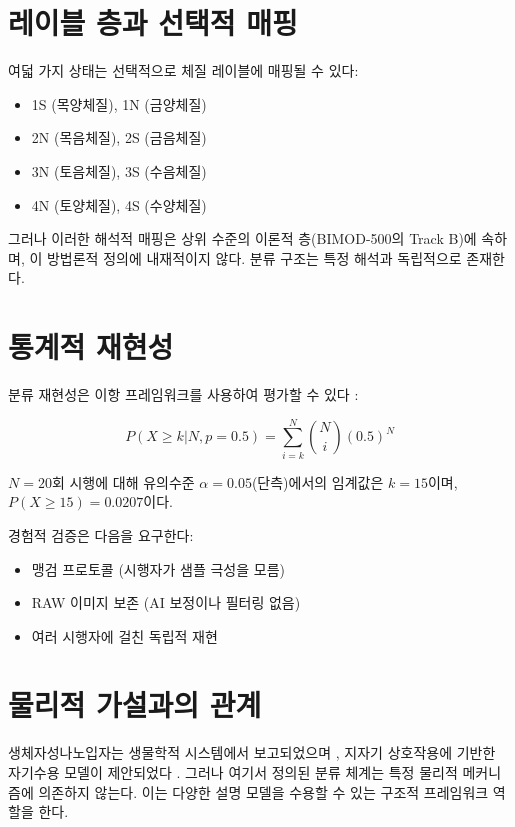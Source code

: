 \documentclass[12pt,a4paper]{article}
\begin{document}
\section{레이블 층과 선택적 매핑}

여덟 가지 상태는 선택적으로 체질 레이블에 매핑될 수 있다:

\begin{itemize}
    \item 1S (목양체질), 1N (금양체질)
    \item 2N (목음체질), 2S (금음체질)
    \item 3N (토음체질), 3S (수음체질)
    \item 4N (토양체질), 4S (수양체질)
\end{itemize}

그러나 이러한 해석적 매핑은 상위 수준의 이론적 층(BIMOD-500의 Track B)에 속하며, 이 방법론적 정의에 내재적이지 않다. 분류 구조는 특정 해석과 독립적으로 존재한다.

\section{통계적 재현성}

분류 재현성은 이항 프레임워크를 사용하여 평가할 수 있다 \citep{binomialtest}:

\[
P(X \ge k | N, p=0.5) = \sum_{i=k}^{N} \binom{N}{i} (0.5)^N
\]

\(N=20\)회 시행에 대해 유의수준 \(\alpha=0.05\)(단측)에서의 임계값은 \(k=15\)이며, \(P(X \ge 15) = 0.0207\)이다.

경험적 검증은 다음을 요구한다:
\begin{itemize}
    \item 맹검 프로토콜 (시행자가 샘플 극성을 모름)
    \item RAW 이미지 보존 (AI 보정이나 필터링 없음)
    \item 여러 시행자에 걸친 독립적 재현
\end{itemize}

\section{물리적 가설과의 관계}

생체자성나노입자는 생물학적 시스템에서 보고되었으며 \citep{Kirschvink1992}, 지자기 상호작용에 기반한 자기수용 모델이 제안되었다 \citep{Ritz2000}. 그러나 여기서 정의된 분류 체계는 특정 물리적 메커니즘에 의존하지 않는다. 이는 다양한 설명 모델을 수용할 수 있는 구조적 프레임워크 역할을 한다.
\end{document}
